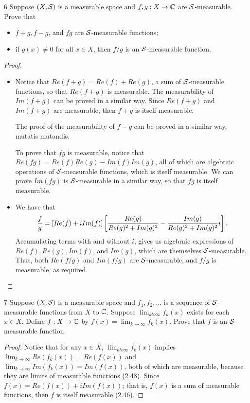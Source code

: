 \begin{exercise}{6}
Suppose $(X, \mathcal{S})$ is a measurable space and $f, g: X \to \mathbb{C}$ are $\mathcal{S}$-measurable.
Prove that
\begin{itemize}
    \item $f+g, f-g$, and $fg$ are $\mathcal{S}$-measurable functions;
    \item if $g(x) \neq 0$ for all $x \in X$, then $f/g$ is an $\mathcal{S}$-measurable function.
\end{itemize}
\end{exercise}
\begin{proof}
\begin{itemize}
    \item Notice that $Re(f+g) = Re(f) + Re(g)$, a sum of $\mathcal{S}$-measurable functions, so that $Re(f+g)$ is measurable. 
    The measurability of $Im(f+g)$ can be proved in a similar way.
    Since $Re(f+g)$ and $Im(f+g)$ are measurable, then $f+g$ is itself measurable.

    The proof of the measurability of $f-g$ can be proved in a similar way, mutatis mutandis.

    To prove that $fg$ is measurable, notice that $Re(fg) = Re(f)Re(g)-Im(f)Im(g)$, all of which are algebraic operations of $\mathcal{S}$-measurable functions, which is itself measurable.
    We can prove $Im(fg)$ is $\mathcal{S}$-measurable in a similar way, so that $fg$ is itself measurable.
    \item We have that 
    \begin{align*}
        \frac{f}{g} = [Re(f) + iIm(f)]\left[ \frac{Re(g)}{Re(g)^2  + Im(g)^2} - \frac{Im(g)}{Re(g)^2  + Im(g)^2}i\right].
    \end{align*}
    Accumulating terms with and without $i$, gives us algebraic expressions of $Re(f), Re(g), Im(f)$, and $Im(g)$, which are themselves $\mathcal{S}$-measurable.
    Thus, both $Re(f/g)$ and $Im(f/g)$ are $\mathcal{S}$-measurable, and $f/g$ is measurable, as required.
\end{itemize}
\end{proof} 

\begin{exercise}{7}
Suppose $(X, \mathcal{S})$ is a measurable space and $f_1, f_2, \dots$ is a sequence of $\mathcal{S}$-measurable functions from $X$ to $\mathbb{C}$.
Suppose $\lim_{k to \infty} f_k(x)$ exists for each $x \in X$.
Define $f: X \to \mathbb{C}$ by $f(x) = \lim_{k \to \infty} f_k(x)$.
Prove that $f$ is an $\mathcal{S}$-measurable function.
\end{exercise}
\begin{proof}
Notice that for any $x \in X$, $\lim_{k to \infty} f_k(x)$ implies $\lim_{k \to \infty} Re(f_k(x)) = Re(f(x))$ and $\lim_{k \to \infty} Im(f_k(x)) = Im(f(x))$, both of which are measurable, because they are limits of measurable functions (2.48).
Since $f(x) = Re(f(x)) + iIm(f(x))$;
that is, $f(x)$ is a sum of measurable functions, then $f$ is itself measurable (2.46).
\end{proof} 


